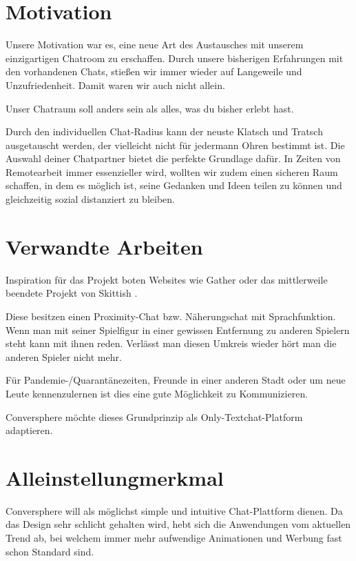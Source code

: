 \documentclass[conference]{IEEEtran}
\begin{document}
	\section{Motivation}
	Unsere Motivation war es, eine neue Art des Austausches mit unserem einzigartigen Chatroom zu erschaffen. 
	Durch unsere bisherigen Erfahrungen mit den vorhandenen Chats, stießen wir immer wieder auf Langeweile und Unzufriedenheit. Damit waren wir auch nicht allein.
	
	Unser Chatraum soll anders sein als alles, was du bisher erlebt hast. 
	
	Durch den individuellen Chat-Radius kann der neuste Klatsch und Tratsch ausgetauscht werden, der vielleicht nicht für jedermann Ohren bestimmt ist. Die Auswahl deiner Chatpartner bietet die perfekte Grundlage dafür. 
	In Zeiten von Remotearbeit immer essenzieller wird, wollten wir zudem einen sicheren Raum schaffen, in dem es möglich ist, seine Gedanken und Ideen teilen zu können und gleichzeitig sozial distanziert zu bleiben.
	\ \\

	\section{Verwandte Arbeiten}
	Inspiration für das Projekt boten Websites wie Gather \cite{gathertown} oder das mittlerweile beendete Projekt von Skittish \cite{skittish}.
	
	Diese besitzen einen Proximity-Chat bzw. Näherungschat mit Sprachfunktion. Wenn man mit seiner Spielfigur in einer gewissen Entfernung zu anderen Spielern steht kann mit ihnen reden. Verlässt man diesen Umkreis wieder hört man die anderen Spieler nicht mehr.
	
	Für Pandemie-/Quarantänezeiten, Freunde in einer anderen Stadt oder um neue Leute kennenzulernen ist dies eine gute Möglichkeit zu Kommunizieren.
	
	Conversphere möchte dieses Grundprinzip als Only-Textchat-Platform adaptieren.
	\ \\

	\section{Alleinstellungmerkmal}
	Conversphere will als möglichst simple und intuitive Chat-Plattform dienen. Da das Design sehr schlicht gehalten wird, hebt sich die Anwendungen vom aktuellen Trend ab, bei welchem immer mehr aufwendige Animationen und Werbung fast schon Standard sind.
	
\end{document}
